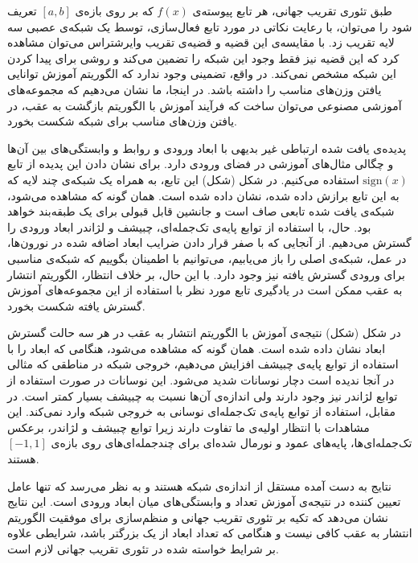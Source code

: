 \documentclass[12pt,onecolumn,a4paper]{article}
\begin{document}
طبق تئوری تقریب جهانی، هر تابع پیوسته‌ی $f(x)$ که بر روی بازه‌ی $[a,b]$ تعریف شود را می‌توان، با رعایت نکاتی در مورد تابع فعال‌سازی، توسط یک شبکه‌ی عصبی سه لایه تقریب زد. با مقایسه‌ی این قضیه و قضیه‌ی تقریب وایرشتراس می‌توان مشاهده کرد که این قضیه نیز فقط وجود این شبکه را تضمین می‌کند و روشی برای پیدا کردن این شبکه مشخص نمی‌کند. در واقع، تضمینی وجود ندارد که الگوریتم آموزش توانایی یافتن وزن‌های مناسب را داشته باشد. در اینجا، ما نشان می‌دهیم که مجموعه‌های آموزشی مصنوعی می‌توان ساخت که فرآیند آموزش با الگوریتم بازگشت به عقب، در یافتن وزن‌های مناسب برای شبکه شکست بخورد.

پدیده‌ی یافت شده ارتباطی غیر بدیهی با ابعاد ورودی و روابط و وابستگی‌های بین آن‌ها و چگالی مثال‌های آموزشی در فضای ورودی دارد. برای نشان دادن این پدیده از تابع $\mathrm{sign}(x)$ استفاده می‌کنیم. در شکل (شکل) این تابع، به همراه یک شبکه‌ی چند لایه که به این تابع برازش داده شده، نشان داده شده است. همان گونه که مشاهده می‌شود، شبکه‌ی یافت شده تابعی صاف است و جانشین قابل قبولی برای یک طبقه‌بند خواهد بود. حال، با استفاده از توابع پایه‌ی تک‌جمله‌ای، چبیشف و لژاندر ابعاد ورودی را گسترش می‌دهیم. از آنجایی که با صفر قرار دادن ضرایب ابعاد اضافه شده در نورون‌ها، در عمل، شبکه‌ی اصلی را باز می‌یابیم، می‌توانیم با اطمینان بگوییم که شبکه‌ی مناسبی برای ورودی گسترش یافته نیز وجود دارد. با این حال، بر خلاف انتظار، الگوریتم انتشار به عقب ممکن است در یادگیری تابع مورد نظر با استفاده از این مجموعه‌های آموزش گسترش یافته شکست بخورد.

در شکل (شکل) نتیجه‌ی آموزش با الگوریتم انتشار به عقب در هر سه حالت گسترش ابعاد نشان داده شده است. همان گونه که مشاهده می‌شود، هنگامی که ابعاد را با استفاده از توابع پایه‌ی چبیشف افزایش می‌دهیم، خروجی شبکه در مناطقی که مثالی در آنجا ندیده است دچار نوسانات شدید می‌شود. این نوسانات در صورت استفاده از توابع لژاندر نیز وجود دارند ولی اندازه‌ی آن‌ها نسبت به چبیشف بسیار کمتر است. در مقابل، استفاده از توابع پایه‌ی تک‌جمله‌ای نوسانی به خروجی شبکه وارد نمی‌کند. این مشاهدات با انتظار اولیه‌ی ما تفاوت دارند زیرا توابع چبیشف و لژاندر، برعکس تک‌جمله‌ای‌ها، پایه‌های عمود و نورمال شده‌ای برای چندجمله‌ای‌های روی بازه‌ی $[-1,1]$ هستند.

نتایج به دست آمده مستقل از اندازه‌ی شبکه هستند و به نظر می‌رسد که تنها عامل تعیین کننده در نتیجه‌ی آموزش تعداد و وابستگی‌های میان ابعاد ورودی است. این نتایج نشان می‌دهد که تکیه بر تئوری تقریب جهانی و منظم‌سازی برای موفقیت الگوریتم انتشار به عقب کافی نیست و هنگامی که تعداد ابعاد از یک بزرگتر باشد، شرایطی علاوه بر شرایط خواسته شده در تئوری تقریب جهانی لازم است.
\end{document}
